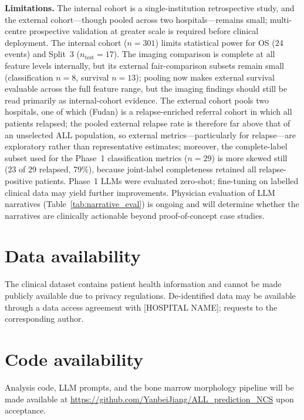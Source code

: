 \documentclass[pdflatex,sn-nature]{sn-jnl}
\begin{document}
\textbf{Limitations.}
The internal cohort is a single-institution retrospective study, and
the external cohort—though pooled across two hospitals—remains small;
multi-centre prospective validation at greater scale is required
before clinical deployment.
The internal cohort ($n=301$) limits statistical power for OS
(24 events) and Split~3 ($n_\text{test}=17$).
The imaging comparison is complete at all feature levels internally,
but its external fair-comparison subsets remain small (classification
$n=8$, survival $n=13$); pooling now makes external survival
evaluable across the full feature range, but the imaging findings
should still be read primarily as internal-cohort evidence.
The external cohort pools two hospitals, one of which (Fudan) is a
relapse-enriched referral cohort in which all patients relapsed;
the pooled external relapse rate is therefore far above that of an
unselected ALL population, so external metrics—particularly for
relapse—are exploratory rather than representative estimates;
moreover, the complete-label subset used for the Phase~1
classification metrics ($n{=}29$) is more skewed still (23 of 29
relapsed, 79\%), because joint-label completeness retained all
relapse-positive patients.
Phase~1 LLMs were evaluated zero-shot; fine-tuning on labelled clinical
data may yield further improvements.
Physician evaluation of LLM narratives (Table~\ref{tab:narrative_eval})
is ongoing and will determine whether the narratives are clinically
actionable beyond proof-of-concept case studies.


\section*{Data availability}

The clinical dataset contains patient health information and cannot be
made publicly available due to privacy regulations.
De-identified data may be available through a data access agreement
with [HOSPITAL NAME]; requests to the corresponding author.

\section*{Code availability}

Analysis code, LLM prompts, and the bone marrow morphology pipeline
will be made available at
\url{https://github.com/YanbeiJiang/ALL_prediction_NCS}
upon acceptance.
\end{document}

